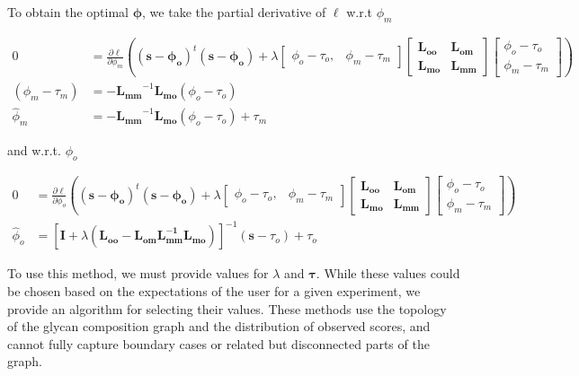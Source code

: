         To obtain the optimal $\mathbf{\phi}$, we take the partial
        derivative of $\ell$ w.r.t $\phi_m$

        \begin{align}
            0 &= \frac{\partial\ell}{\partial\phi_m}\left((\mathbf{s} - \mathbf{\phi_o})^t(\mathbf{s} - \mathbf{\phi_o}) + \lambda
                \begin{bmatrix}
                    \phi_o - \tau_o, & \phi_m - \tau_m
                \end{bmatrix}
                \begin{bmatrix}
                    \mathbf{L_{oo}} & \mathbf{L_{om}} \\ \mathbf{L_{mo}} & \mathbf{L_{mm}}
                \end{bmatrix}
                \begin{bmatrix}
                    \phi_o - \tau_o \\ \phi_m - \tau_m
                \end{bmatrix}\right)\\
            (\phi_m - \tau_m) &= -\mathbf{L_{mm}}^{-1}\mathbf{L_{mo}}(\phi_o - \tau_o) \nonumber\\
            {\hat \phi_m} &= -\mathbf{L_{mm}}^{-1}\mathbf{L_{mo}}(\phi_o - \tau_o) + \tau_m
            \label{eqn:estimate_of_phi_m}
        \end{align}

        \noindent and w.r.t. $\phi_o$

        \begin{align}
            0 &= \frac{\partial\ell}{\partial\phi_o}\left((\mathbf{s} - \mathbf{\phi_o}
                )^t(\mathbf{s} - \mathbf{\phi_o}) + \lambda
                \begin{bmatrix}
                    \phi_o - \tau_o, & \phi_m - \tau_m
                \end{bmatrix}
                \begin{bmatrix}
                    \mathbf{L_{oo}} & \mathbf{L_{om}} \\ \mathbf{L_{mo}} & \mathbf{L_{mm}}
                \end{bmatrix}
                \begin{bmatrix}
                    \phi_o - \tau_o \\ \phi_m - \tau_m
                \end{bmatrix}\right)\\
            {\hat \phi_o} &= \left[
                \mathbf{I} + \lambda\left(\mathbf{L_{oo}} -
                    \mathbf{L_{om}}\mathbf{L_{mm}^{-1}}\mathbf{L_{mo}}
                \right)
            \right]^{-1}(\mathbf{s} - \tau_o) + \tau_o
            \label{eqn:estimate_of_phi_o}
        \end{align}

        To use this method, we must provide values for $\lambda$ and $\mathbf{\tau}$.
        While these values could be chosen based on the expectations of the user for
        a given experiment, we provide an algorithm for selecting their values.
        These methods use the topology of the glycan composition graph and the
        distribution of observed scores, and cannot fully capture boundary cases
        or related but disconnected parts of the graph.
